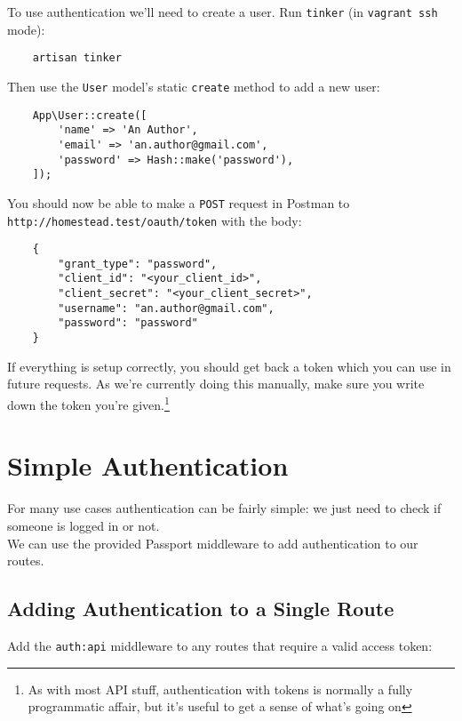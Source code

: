 To use authentication we'll need to create a user. Run \texttt{tinker} (in \texttt{vagrant ssh} mode):

\begin{verbatim}
    artisan tinker
\end{verbatim}

Then use the \texttt{User} model's static \texttt{create} method to add a new user:

\begin{verbatim}
    App\User::create([
        'name' => 'An Author',
        'email' => 'an.author@gmail.com',
        'password' => Hash::make('password'),
    ]);
\end{verbatim}

You should now be able to make a \texttt{POST} request in Postman to \\ \texttt{http://homestead.test/oauth/token} with the body:

\begin{verbatim}
    {
        "grant_type": "password",
        "client_id": "<your_client_id>",
        "client_secret": "<your_client_secret>",
        "username": "an.author@gmail.com",
        "password": "password"
    }
\end{verbatim}

If everything is setup correctly, you should get back a token which you can use in future requests. As we're currently doing this manually, make sure you write down the token you're given.\footnote{As with most API stuff, authentication with tokens is normally a fully programmatic affair, but it's useful to get a sense of what's going on}


\pagebreak


\section{Simple Authentication}

For many use cases authentication can be fairly simple: we just need to check if someone is logged in or not.
\\

We can use the provided Passport middleware to add authentication to our routes.


\subsection{Adding Authentication to a Single Route}

Add the \texttt{auth:api} middleware to any routes that require a valid access token:

